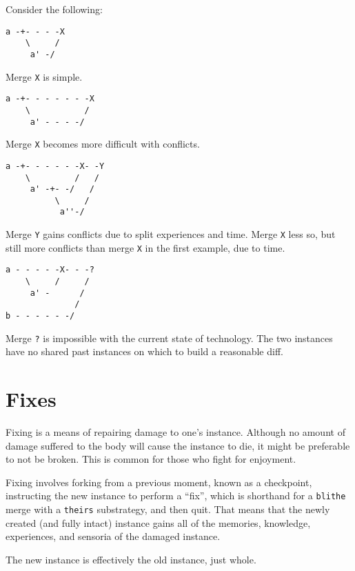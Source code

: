 \newpage

Consider the following:

\begin{verbatim}
a -+- - - -X
    \     /
     a' -/
\end{verbatim}

Merge \texttt{X} is simple.

\begin{verbatim}
a -+- - - - - - -X
    \           /
     a' - - - -/
\end{verbatim}

Merge \texttt{X} becomes more difficult with conflicts.

\begin{verbatim}
a -+- - - - - -X- -Y
    \         /   /
     a' -+- -/   /
          \     /
           a''-/
\end{verbatim}

Merge \texttt{Y} gains conflicts due to split experiences and time. Merge \texttt{X} less so, but still more conflicts than merge \texttt{X} in the first example, due to time.

\begin{verbatim}
a - - - - -X- - -?
    \     /     /
     a' -      /
              /
b - - - - - -/
\end{verbatim}

Merge \texttt{?} is impossible with the current state of technology. The two instances have no shared past instances on which to build a reasonable diff.

\hypertarget{fixes}{%
\section*{Fixes}\label{fixes}}

Fixing is a means of repairing damage to one's instance. Although no amount of damage suffered to the body will cause the instance to die, it might be preferable to not be broken. This is common for those who fight for enjoyment.

Fixing involves forking from a previous moment, known as a checkpoint, instructing the new instance to perform a ``fix'', which is shorthand for a \texttt{blithe} merge with a \texttt{theirs} substrategy, and then quit. That means that the newly created (and fully intact) instance gains all of the memories, knowledge, experiences, and sensoria of the damaged instance.

The new instance is effectively the old instance, just whole.

